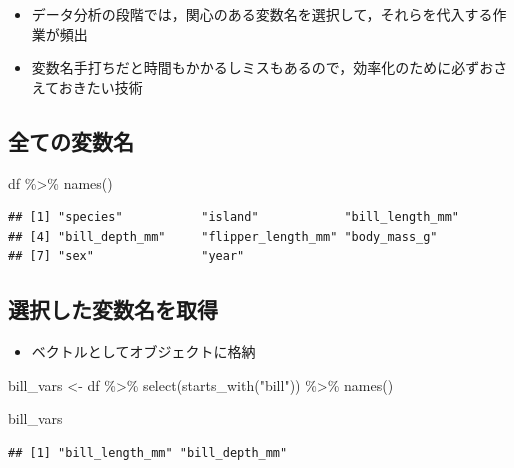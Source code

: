 \documentclass[
  xelatex,ja=standard, b5paper]{bxjsbook}
\newenvironment{Shaded}{\begin{snugshade}}{\end{snugshade}}
\newcommand{\FunctionTok}[1]{\textcolor[rgb]{0.00,0.00,0.00}{#1}}
\newcommand{\NormalTok}[1]{#1}
\newcommand{\OtherTok}[1]{\textcolor[rgb]{0.56,0.35,0.01}{#1}}
\newcommand{\SpecialCharTok}[1]{\textcolor[rgb]{0.00,0.00,0.00}{#1}}
\newcommand{\StringTok}[1]{\textcolor[rgb]{0.31,0.60,0.02}{#1}}
\providecommand{\tightlist}{%
  \setlength{\itemsep}{0pt}\setlength{\parskip}{0pt}}
\begin{document}
\begin{itemize}
\tightlist
\item
  データ分析の段階では，関心のある変数名を選択して，それらを代入する作業が頻出
\item
  変数名手打ちだと時間もかかるしミスもあるので，効率化のために必ずおさえておきたい技術
\end{itemize}

\hypertarget{select-get-name}{%
\subsection{全ての変数名}\label{select-get-name}}

\begin{Shaded}
\begin{Highlighting}[]
\NormalTok{df }\SpecialCharTok{\%\textgreater{}\%} \FunctionTok{names}\NormalTok{()}
\end{Highlighting}
\end{Shaded}

\begin{verbatim}
## [1] "species"           "island"            "bill_length_mm"   
## [4] "bill_depth_mm"     "flipper_length_mm" "body_mass_g"      
## [7] "sex"               "year"
\end{verbatim}

\hypertarget{select-get-obj}{%
\subsection{選択した変数名を取得}\label{select-get-obj}}

\begin{itemize}
\tightlist
\item
  ベクトルとしてオブジェクトに格納
\end{itemize}

\begin{Shaded}
\begin{Highlighting}[]
\NormalTok{bill\_vars }\OtherTok{\textless{}{-}} 
\NormalTok{  df }\SpecialCharTok{\%\textgreater{}\%} 
  \FunctionTok{select}\NormalTok{(}\FunctionTok{starts\_with}\NormalTok{(}\StringTok{"bill"}\NormalTok{)) }\SpecialCharTok{\%\textgreater{}\%} 
  \FunctionTok{names}\NormalTok{()}

\NormalTok{bill\_vars}
\end{Highlighting}
\end{Shaded}

\begin{verbatim}
## [1] "bill_length_mm" "bill_depth_mm"
\end{verbatim}
\end{document}
